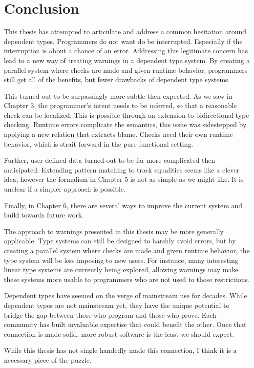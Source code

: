 \chapter{Conclusion}
\label{chapter:Conclusion}
\thispagestyle{myheadings}

This thesis has attempted to articulate and address a common hesitation
around dependent types. Programmers do not want do be interrupted.
Especially if the interruption is about a chance of an error. Addressing
this legitimate concern has lead to a new way of treating warnings
in a dependent type system. By creating a parallel system where checks
are made and given runtime behavior, programmers still get all of
the benefits, but fewer drawbacks of dependent type systems.

This turned out to be surpassingly more subtle then expected. As we
saw in Chapter 3, the programmer's intent needs to be inferred, so
that a reasonable check can be localized. This is possible through
an extension to bidirectional type checking. Runtime errors complicate
the semantics, this issue was sidestepped by applying a new relation
that extracts blame. Checks need their own runtime behavior, which
is strait forward in the pure functional setting.

Further, user defined data turned out to be far more complicated then
anticipated. Extending pattern matching to track equalities seems
like a clever idea, however the formalism in Chapter 5 is not as simple
as we might like. It is unclear if a simpler approach is possible.

Finally, in Chapter 6, there are several ways to improve the current
system and build towards future work.

The approach to warnings presented in this thesis may be more generally
applicable. Type systems can still be designed to harshly avoid errors,
but by creating a parallel system where checks are made and given
runtime behavior, the type system will be less imposing to new users.
For instance, many interesting linear type systems are currently being
explored, allowing warnings may make these systems more usable to
programmers who are not used to those restrictions.

Dependent types have seemed on the verge of mainstream use for decades.
While dependent types are not mainstream yet, they have the unique
potential to bridge the gap between those who program and those who
prove. Each community has built invaluable expertise that could benefit
the other. Once that connection is made solid, more robust software
is the least we should expect.

While this thesis has not single handedly made this connection, I
think it is a necessary piece of the puzzle.
